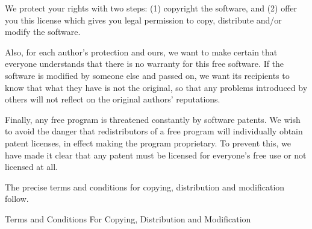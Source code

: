 \documentclass{article}
\begin{document}
We protect your rights with two steps: (1) copyright the software, and (2)
offer you this license which gives you legal permission to copy,
distribute and/or modify the software.

Also, for each author's protection and ours, we want to make certain that
everyone understands that there is no warranty for this free software.  If
the software is modified by someone else and passed on, we want its
recipients to know that what they have is not the original, so that any
problems introduced by others will not reflect on the original authors'
reputations.

Finally, any free program is threatened constantly by software patents.
We wish to avoid the danger that redistributors of a free program will
individually obtain patent licenses, in effect making the program
proprietary.  To prevent this, we have made it clear that any patent must
be licensed for everyone's free use or not licensed at all.

The precise terms and conditions for copying, distribution and
modification follow.

\begin{center}
{\Large \sc Terms and Conditions For Copying, Distribution and
  Modification}
\end{center}
\end{document}
